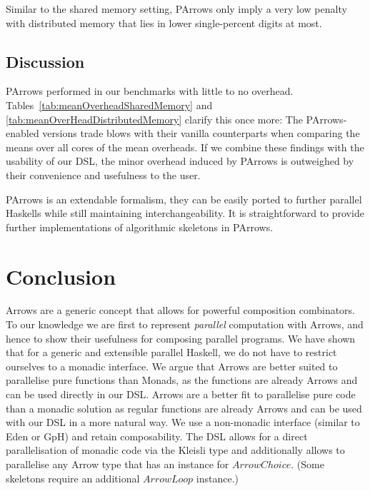\documentclass{jfp1}
\newcommand{\Conid}[1]{\mathit{#1}}
\begin{document}
Similar to the shared memory setting, PArrows only imply a very low penalty with distributed memory that lies in lower single-percent digits at most.

\subsection{Discussion}



PArrows performed in our benchmarks with little to no overhead. Tables~\ref{tab:meanOverheadSharedMemory} and \ref{tab:meanOverHeadDistributedMemory} clarify this once more: The PArrows-enabled versions trade blows with their vanilla counterparts when comparing the means over all cores of the mean overheads. If we combine these findings with the usability of our DSL,
the minor overhead induced by PArrows is outweighed by their convenience and usefulness to the user.

PArrows is an extendable formalism, they can be easily ported to further parallel Haskells while still maintaining interchangeability. It is straightforward to provide further implementations of algorithmic skeletons in PArrows.
	
\section{Conclusion}
\label{sec:conclusion}
Arrows are a generic concept that allows for powerful composition
combinators. To our knowledge we are first to represent
\emph{parallel} computation with
Arrows, and hence to show their usefulness for
composing parallel
programs. We have shown that for a generic and extensible parallel Haskell, we do not have to restrict ourselves to a monadic interface. %
We argue that Arrows are better suited to  parallelise
pure functions than Monads,  as the functions are already Arrows and can be used
directly in our DSL.
Arrows are a better fit to parallelise pure code than a monadic solution as regular functions are already Arrows and can be used with our DSL in a more natural way. %
We use a non-monadic interface (similar to Eden or GpH) and retain composability.
%
The DSL allows for a direct parallelisation of monadic code via the Kleisli type and additionally allows to parallelise any Arrow type that has an instance for \ensuremath{\Conid{ArrowChoice}}. (Some skeletons require an additional \ensuremath{\Conid{ArrowLoop}} instance.)
\end{document}

